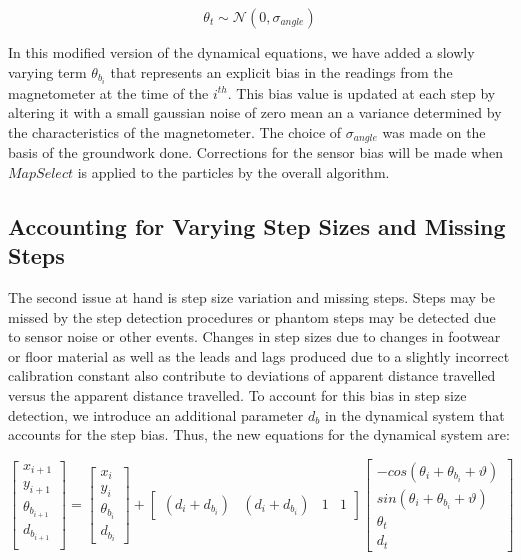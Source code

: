 \begin{equation}
\theta_t \sim \mathcal{N}(0,\sigma_{angle})
\end{equation}

In this modified version of the dynamical equations, we have added a slowly
varying term $\theta_{b_i}$ that represents an explicit bias in the readings
from the magnetometer at the time of the $i^{th}$. This bias value is updated at
each step by altering it with a small gaussian noise of zero mean an a variance
determined by the characteristics of the magnetometer. The choice of
$\sigma_{angle}$ was made on the basis of the groundwork done. Corrections
for the sensor bias will be made when $MapSelect$ is applied to the particles by
the overall algorithm.

\subsection{Accounting for Varying Step Sizes and Missing Steps\label{sec:step_bias}}

The second issue at hand is step size variation and missing steps. Steps may
be missed by the step detection procedures or phantom steps may be detected
due to sensor noise or other events. Changes in step sizes due to changes in 
footwear or floor material as well as the leads and lags produced due to a 
slightly incorrect calibration constant also contribute to deviations of 
apparent distance travelled versus the apparent distance travelled. To account
for this bias in step size detection, we introduce an additional parameter
$d_{b}$ in the dynamical system that accounts for the step bias. 
Thus, the new equations for the dynamical system are:

\begin{equation}
\begin{bmatrix}x_{i+1}\\
y_{i+1}\\
\theta_{b_{i+1}}\\
d_{b_{i+1}}\\
\end{bmatrix} = \begin{bmatrix}x_{i}\\
y_{i}\\
\theta_{b_i}\\
d_{b_i}
\end{bmatrix}  + \begin{bmatrix}(d{}_{i}+d_{b_i}) & (d{}_{i}+d_{b_i}) & 1 & 1\end{bmatrix} \begin{bmatrix}-cos(\theta_{i}+\theta_{b_i}+\vartheta)\\
sin(\theta_{i}+\theta_{b_i}+\vartheta)\\
\theta_t\\
d_{t}
\end{bmatrix} 
\end{equation}

